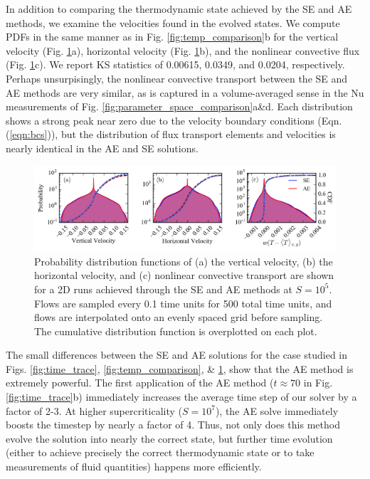 \documentclass[aps, pre, onecolumn, nofootinbib, notitlepage, groupedaddress, amsfonts, amssymb, amsmath, longbibliography]{revtex4-1}
\begin{document}
In addition to comparing the thermodynamic state achieved by the SE and AE methods,
we examine the velocities found in the evolved states.
We compute PDFs in the same manner as in Fig. \ref{fig:temp_comparison}b for the
vertical velocity (Fig. \ref{fig:pdf_comparison}a), horizontal velocity (Fig. \ref{fig:pdf_comparison}b),
and the nonlinear convective flux (Fig. \ref{fig:pdf_comparison}c). We report KS statistics
of 0.00615, 0.0349, and 0.0204, respectively.  Perhaps unsurpisingly, the nonlinear
convective transport between the SE and AE methods are very similar, as is captured
in a volume-averaged sense in the Nu measurements of Fig. \ref{fig:parameter_space_comparison}a\&d.
Each distribution shows a strong peak near zero due to the velocity boundary conditions
(Eqn. (\ref{eqn:bcs})), but the distribution of flux transport elements and velocities
is nearly identical in the AE and SE solutions.

\begin{figure}[t]
\includegraphics[width=\textwidth]{./figs/pdf_comparison.png}
\caption{Probability distribution functions of (a) the vertical velocity, (b) the horizontal velocity, and (c) nonlinear
convective transport are shown for a 2D runs achieved through the SE and AE methods
at $S = 10^{5}$.  Flows are sampled every 0.1 time units for 500 total time units,
and flows are interpolated onto an evenly spaced grid before sampling.
The cumulative distribution function is overplotted on each plot. 
\label{fig:pdf_comparison} }
\end{figure}


The small differences between the SE and AE solutions for the case studied in 
Figs. \ref{fig:time_trace}, \ref{fig:temp_comparison}, \& \ref{fig:pdf_comparison},
show that the AE method is extremely powerful.  The first application of the AE method
($t \approx 70$ in Fig. \ref{fig:time_trace}b) immediately increases the 
average time step of our solver by a factor of 2-3. At higher supercriticality
($S = 10^7$), the AE solve immediately boosts the timestep by nearly a factor of 4.
Thus, not only does this method evolve the solution into nearly the correct state, 
but further time evolution (either to achieve precisely the correct thermodynamic
state or to take measurements of fluid quantities) happens more efficiently.
\end{document}
